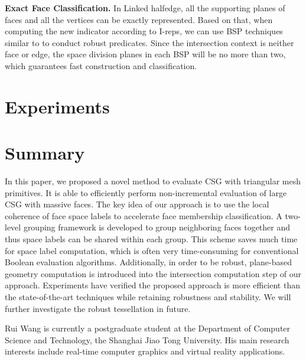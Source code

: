\documentclass[10pt,journal,compsoc]{IEEEtran}
\begin{document}
\vspace{0.5em}
\noindent \textbf{Exact Face Classification.} In Linked halfedge, all the supporting planes of faces and all the vertices can be exactly represented. Based on that, when computing the new indicator according to I-reps, we can use BSP techniques similar to \cite{bernstein2009fast} to conduct robust predicates. Since the intersection context is neither face or edge, the space division planes in each BSP will be no more than two, which guarantees fast construction and classification.

\section{Experiments}

\section{Summary}

In this paper, we proposed a novel method to evaluate CSG with triangular mesh primitives. It is able to efficiently perform non-incremental evaluation of large CSG with massive faces. The key idea of our approach is to use the local coherence of face space labels to accelerate face membership classification. A two-level grouping framework is developed to group neighboring faces together and thus space labels can be shared within each group. This scheme saves much time for space label computation, which is often very time-consuming for conventional Boolean evaluation algorithms. Additionally, in order to be robust, plane-based geometry computation is introduced into the intersection computation step of our approach. Experiments have verified the proposed approach is more efficient than the state-of-the-art techniques while retaining robustness and stability. We will further investigate the robust tessellation in future.



\appendices







\begin{IEEEbiography}{Rui Wang}
is currently a postgraduate student at the Department of Computer Science and Technology, the Shanghai Jiao Tong University. His main research interests include real-time computer graphics and virtual reality applications.
\end{IEEEbiography}
\end{document}
